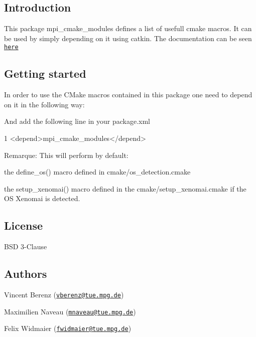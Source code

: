 \subsection*{Introduction}

This package {\ttfamily mpi\+\_\+cmake\+\_\+modules} defines a list of usefull cmake macros. It can be used by simply depending on it using catkin. The documentation can be seen \href{https://machines-in-motion.github.io/}{\tt here}

\subsection*{Getting started}

In order to use the C\+Make macros contained in this package one need to depend on it in the following way\+: 


And add the following line in your {\ttfamily package.\+xml}


\begin{DoxyCode}
1 <\textcolor{keywordtype}{depend}>\textcolor{keyword}{mpi\_cmake\_modules}</\textcolor{keywordtype}{depend}>
\end{DoxyCode}


Remarque\+: This will perform by default\+:
\begin{DoxyItemize}
\item the {\ttfamily define\+\_\+os()} macro defined in cmake/os\+\_\+detection.\+cmake
\item the {\ttfamily setup\+\_\+xenomai()} macro defined in the cmake/setup\+\_\+xenomai.\+cmake if the OS Xenomai is detected.
\end{DoxyItemize}

\subsection*{License}

B\+SD 3-\/\+Clause

\subsection*{Authors}


\begin{DoxyItemize}
\item Vincent Berenz (\href{mailto:vberenz@tue.mpg.de}{\tt vberenz@tue.\+mpg.\+de})
\item Maximilien Naveau (\href{mailto:mnaveau@tue.mpg.de}{\tt mnaveau@tue.\+mpg.\+de})
\item Felix Widmaier (\href{mailto:fwidmaier@tue.mpg.de}{\tt fwidmaier@tue.\+mpg.\+de}) 
\end{DoxyItemize}